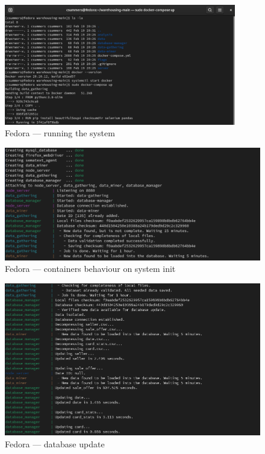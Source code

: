 \begin{figure}[ht]
    \centering
    \includegraphics[width=0.9\textwidth]{figures/fedora.png}
    \caption{Fedora --- running the system}
    \label{fig:fedora}
\end{figure}

\begin{figure}
    \centering
    \includegraphics[width=\textwidth]{figures/fedora_init.png}
    \caption{Fedora --- containers behaviour on system init}
    \label{fig:fedora_init}
\end{figure}

\begin{figure}
    \centering
    \includegraphics[width=\textwidth]{figures/fedora_db_update.png}
    \caption{Fedora --- database update}
    \label{fig:fedora_db_update}
\end{figure}

